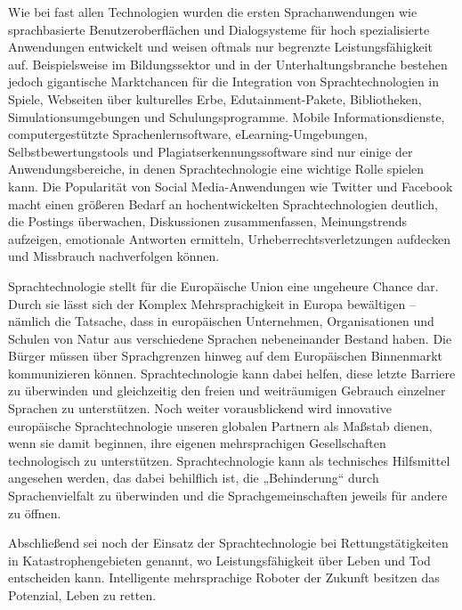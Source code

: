\documentclass[]{../../metanetpaper}
\begin{document}
\begin{Parallel}[c]{79mm}{78mm}
{Wie bei fast allen Technologien wurden die ersten Sprachanwendungen wie sprachbasierte Benutzeroberflächen und Dialogsysteme für hoch spezialisierte Anwendungen entwickelt und weisen oftmals nur begrenzte Leistungsfähigkeit auf. Beispielsweise im Bildungssektor und in der Unterhaltungsbranche bestehen jedoch gigantische Marktchancen für die Integration von Sprachtechnologien in Spiele, Webseiten über kulturelles Erbe, Edutainment-Pakete, Bibliotheken, Simulationsumgebungen und Schulungsprogramme. Mobile Informationsdienste, computergestützte Sprachenlernsoftware, eLearning-Umgebungen, Selbstbewertungstools und Plagiatserkennungssoftware sind nur einige der Anwendungsbereiche, in denen Sprachtechnologie eine wichtige Rolle spielen kann. Die Popularität von Social Media-Anwendungen wie Twitter und Facebook macht einen größeren Bedarf an hochentwickelten Sprachtechnologien deutlich, die Postings überwachen, Diskussionen zusammenfassen, Meinungstrends aufzeigen, emotionale Antworten ermitteln, Urheberrechtsverletzungen aufdecken und Missbrauch nachverfolgen können.

Sprachtechnologie stellt für die Europäische Union eine ungeheure Chance dar. Durch sie lässt sich der Komplex Mehrsprachigkeit in Europa bewältigen – nämlich die Tatsache, dass in europäischen Unternehmen, Organisationen und Schulen von Natur aus verschiedene Sprachen nebeneinander Bestand haben. Die Bürger müssen über Sprachgrenzen hinweg auf dem Europäischen Binnenmarkt kommunizieren können. Sprachtechnologie kann dabei helfen, diese letzte Barriere zu überwinden und gleichzeitig den freien und weiträumigen Gebrauch einzelner Sprachen zu unterstützen. Noch weiter vorausblickend wird innovative europäische Sprachtechnologie unseren globalen Partnern als Maßstab dienen, wenn sie damit beginnen, ihre eigenen mehrsprachigen Gesellschaften technologisch zu unterstützen. Sprachtechnologie kann als technisches Hilfsmittel angesehen werden, das dabei behilflich ist, die „Behinderung“ durch Sprachenvielfalt zu überwinden und die Sprachgemeinschaften jeweils für andere zu öffnen.

Abschließend sei noch der Einsatz der Sprachtechnologie bei Rettungstätigkeiten in Katastrophengebieten genannt, wo Leistungsfähigkeit über Leben und Tod entscheiden kann. Intelligente mehrsprachige Roboter der Zukunft besitzen das Potenzial, Leben zu retten.
  }

\end{Parallel}
\end{document}

